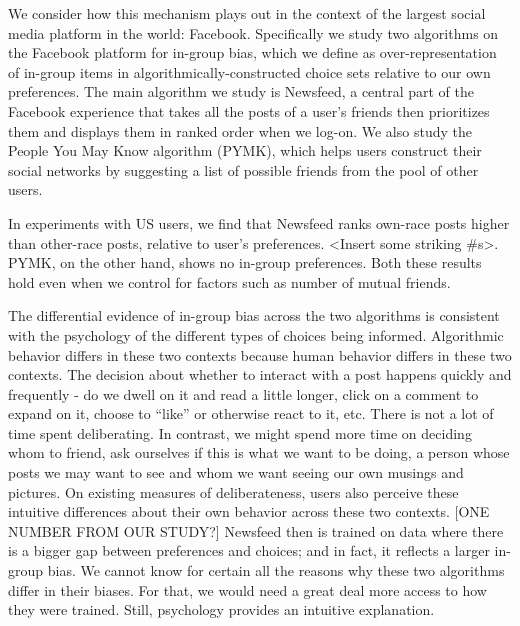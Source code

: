 \documentclass[12pt,letterpaper]{article}
\begin{document}
We consider how this mechanism plays out in the context of the largest social media platform in the world: Facebook. Specifically we study two algorithms on the Facebook platform for in-group bias, which we define as over-representation of in-group items in algorithmically-constructed choice sets relative to our own preferences. The main algorithm we study is Newsfeed, a central part of the Facebook experience that takes all the posts of a user's friends then prioritizes them and displays them in ranked order when we log-on. We also study the People You May Know algorithm (PYMK), which helps users construct their social networks by suggesting a list of possible friends from the pool of other users. 

In experiments with US users, we find that Newsfeed ranks own-race posts higher than other-race posts, relative to user's preferences. <Insert some striking #s>. PYMK, on the other hand, shows no in-group preferences. Both these results hold even when we control for factors such as number of mutual friends. 

The differential evidence of in-group bias across the two algorithms is consistent with the psychology of the different types of choices being informed. Algorithmic behavior differs in these two contexts because human behavior differs in these two contexts. The decision about whether to interact with a post happens quickly and frequently - do we dwell on it and read a little longer, click on a comment to expand on it, choose to ``like'' or otherwise react to it, etc. There is not a lot of time spent deliberating. In contrast, we might spend more time on deciding whom to friend, ask ourselves if this is what we want to be doing, a person whose posts we may want to see and whom we want seeing our own musings and pictures. On existing measures of deliberateness, users also perceive these intuitive differences about their own behavior across these two contexts. [ONE NUMBER FROM OUR STUDY?] Newsfeed then is trained on data where there is a bigger gap between preferences and choices; and in fact, it reflects a larger in-group bias. We cannot know for certain all the reasons why these two algorithms differ in their biases. For that, we would need a great deal more access to how they were trained. Still, psychology provides an intuitive explanation. 

\end{document}
